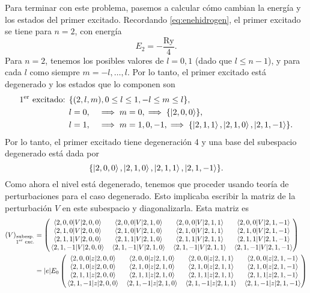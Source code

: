 \documentclass[10pt, a4paper]{article}
\newcommand{\Ry}{\ensuremath{\text{Ry}}}
\numberwithin{equation}{subsection}
\begin{document}
Para terminar con este problema, pasemos a calcular cómo cambian la energía y
los estados del primer excitado. Recordando \eqref{eq:enehidrogen}, el primer
excitado se tiene para $n = 2$, con energía
\begin{equation}
  E_{2} = -\frac{\Ry}{4}.
\end{equation}
Para $n = 2$, tenemos los posibles valores de $l = 0, 1$ (dado que $l \leq
n-1$), y para cada $l$ como siempre $m = -l, \dots, l$. Por lo tanto, el primer
excitado está degenerado y los estados que lo componen son
\begin{align}
  1^{\text{er}}\text{ excitado: }
  &\set{(2,l,m), 0 \leq l \leq 1, -l \leq m \leq l}, \nonumber \\
  &l = 0, \quad \implies m = 0, \implies \set{\ket{2,0,0}}, \nonumber \\
  &l = 1, \quad \implies m = 1,0,-1, \implies \set{\ket{2,1,1}, \ket{2,1,0},
  \ket{2,1,-1}}.
\end{align}
Por lo tanto, el primer excitado tiene degeneración 4 y una base del subespacio
degenerado está dada por
\begin{equation}
  \set{\ket{2,0,0}, \ket{2,1,0}, \ket{2,1,1}, \ket{2,1,-1}}.
\end{equation}
Como ahora el nivel está degenerado, tenemos que proceder usando teoría de
perturbaciones para el caso degenerado. Esto implicaba escribir la matriz de la
perturbación $V$ en este subespacio y diagonalizarla. Esta matriz es
\begin{align}
  (V)_{\substack{\text{subesp.}\\1^{\text{er}}\text{ exc.}}}
  &= \begin{pmatrix}
    \matrixel{2,0,0}{V}{2,0,0} & \matrixel{2,0,0}{V}{2,1,0} &
    \matrixel{2,0,0}{V}{2,1,1} & \matrixel{2,0,0}{V}{2,1,-1} \\
    \matrixel{2,1,0}{V}{2,0,0} & \matrixel{2,1,0}{V}{2,1,0} &
    \matrixel{2,1,0}{V}{2,1,1} & \matrixel{2,1,0}{V}{2,1,-1} \\
    \matrixel{2,1,1}{V}{2,0,0} & \matrixel{2,1,1}{V}{2,1,0} &
    \matrixel{2,1,1}{V}{2,1,1} & \matrixel{2,1,1}{V}{2,1,-1} \\
    \matrixel{2,1,-1}{V}{2,0,0} & \matrixel{2,1,-1}{V}{2,1,0} &
    \matrixel{2,1,-1}{V}{2,1,1} & \matrixel{2,1,-1}{V}{2,1,-1}
  \end{pmatrix} \nonumber \\
  &= \abs{e}E_0 \begin{pmatrix}
    \matrixel{2,0,0}{z}{2,0,0} & \matrixel{2,0,0}{z}{2,1,0} &
    \matrixel{2,0,0}{z}{2,1,1} & \matrixel{2,0,0}{z}{2,1,-1} \\
    \matrixel{2,1,0}{z}{2,0,0} & \matrixel{2,1,0}{z}{2,1,0} &
    \matrixel{2,1,0}{z}{2,1,1} & \matrixel{2,1,0}{z}{2,1,-1} \\
    \matrixel{2,1,1}{z}{2,0,0} & \matrixel{2,1,1}{z}{2,1,0} &
    \matrixel{2,1,1}{z}{2,1,1} & \matrixel{2,1,1}{z}{2,1,-1} \\
    \matrixel{2,1,-1}{z}{2,0,0} & \matrixel{2,1,-1}{z}{2,1,0} &
    \matrixel{2,1,-1}{z}{2,1,1} & \matrixel{2,1,-1}{z}{2,1,-1}
  \end{pmatrix}
\end{align}
\end{document}
